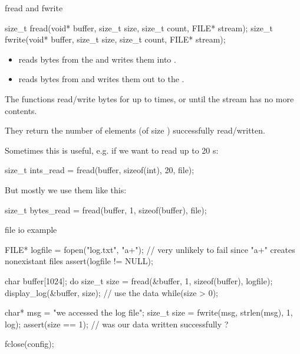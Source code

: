 \documentclass[10pt,graphics,aspectratio=169,table]{beamer}
\begin{document}
\begin{frame}[fragile]{fread and fwrite}
    \begin{small}

    \begin{codeblock}[numbers=none, basicstyle=\small]
size_t fread(void* buffer, size_t size, size_t count, FILE* stream);
size_t fwrite(void* buffer, size_t size, size_t count, FILE* stream);
    \end{codeblock}

    \begin{itemize}
        \item {} reads bytes from the  and writes them into 
        .  

        \item {} reads bytes from  and writes them out to the 
        . 
    
    \end{itemize}

    The functions read/write  bytes for up to  times, or until 
    the stream has no more contents.

    They return the number of elements 
    (of size ) successfully read/written.

    Sometimes this is useful, e.g. if we want to read up to 20 s:
    \begin{codeblock}[numbers=none, basicstyle=\small]
size_t ints_read = fread(buffer, sizeof(int), 20, file);
    \end{codeblock}

    But mostly we use them like this:
    \begin{codeblock}[numbers=none, basicstyle=\small]
size_t bytes_read = fread(buffer, 1, sizeof(buffer), file);
    \end{codeblock}

    \end{small}
\end{frame}

\begin{frame}[fragile]{file io example}
    
    \begin{codeblock}
FILE* logfile = fopen("log.txt", "a+");
// very unlikely to fail since "a+" creates nonexistant files
assert(logfile != NULL);

char buffer[1024]; 
do{
    size_t size = fread(&buffer, 1, sizeof(buffer), logfile);
    display_log(&buffer, size); // use the data
} while(size > 0);

char* msg = "we accessed the log file\n";
size_t size = fwrite(msg, strlen(msg), 1, log);
assert(size == 1); // was our data written successfully ?

fclose(config);
    \end{codeblock}

\end{frame}
\end{document}
